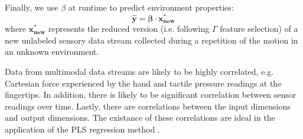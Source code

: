 Finally, we use $\beta$ at runtime to predict environment properties:
  \begin{equation} \mathbf{\hat{y}} = \mathbf{\beta} \cdot \mathbf{x^*_{new}} \end{equation}
where $\mathbf{x^*_{new}}$ represents the reduced version (i.e. following $\Gamma$ feature selection) of a new unlabeled sensory data stream collected during a repetition of the motion in an unknown environment.

Data from multimodal data streams are likely to be highly correlated, e.g. Cartesian force experienced by the hand and tactile pressure readings at the fingertips.
In addition, there is likely to be significant correlation between sensor readings over time.
Lastly, there are correlations between the input dimensions and output dimensions.
The existance of these correlations are ideal in the application of the PLS regression method \cite{Tobias1995}.
